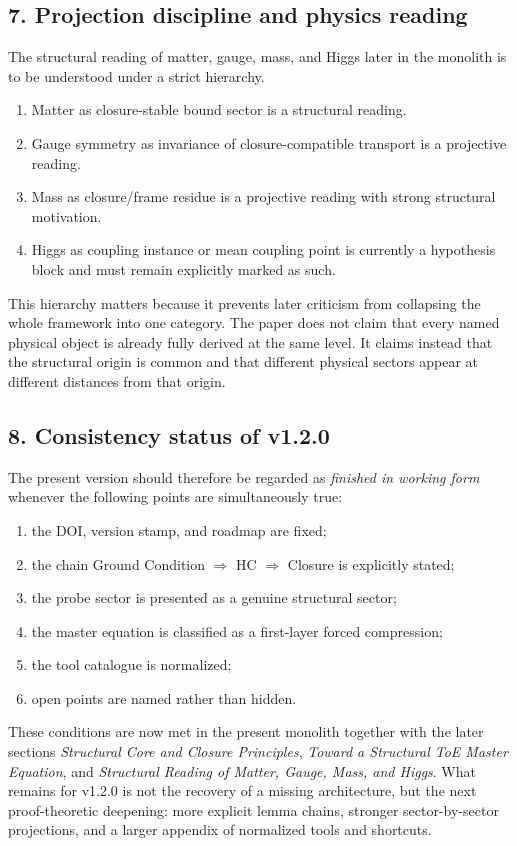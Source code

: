 \subsection*{7. Projection discipline and physics reading}
The structural reading of matter, gauge, mass, and Higgs later in the monolith
is to be understood under a strict hierarchy.
\begin{enumerate}[leftmargin=2em]
  \item Matter as closure-stable bound sector is a structural reading.
  \item Gauge symmetry as invariance of closure-compatible transport is a
  projective reading.
  \item Mass as closure/frame residue is a projective reading with strong
  structural motivation.
  \item Higgs as coupling instance or mean coupling point is currently a
  hypothesis block and must remain explicitly marked as such.
\end{enumerate}

This hierarchy matters because it prevents later criticism from collapsing the
whole framework into one category. The paper does not claim that every named
physical object is already fully derived at the same level. It claims instead
that the structural origin is common and that different physical sectors appear
at different distances from that origin.

\subsection*{8. Consistency status of v1.2.0}
The present version should therefore be regarded as \emph{finished in working
form} whenever the following points are simultaneously true:
\begin{enumerate}[leftmargin=2em]
  \item the DOI, version stamp, and roadmap are fixed;
  \item the chain Ground Condition $\Rightarrow$ HC $\Rightarrow$ Closure is
  explicitly stated;
  \item the probe sector is presented as a genuine structural sector;
  \item the master equation is classified as a first-layer forced compression;
  \item the tool catalogue is normalized;
  \item open points are named rather than hidden.
\end{enumerate}

These conditions are now met in the present monolith together with the later
sections \emph{Structural Core and Closure Principles}, \emph{Toward a
Structural ToE Master Equation}, and \emph{Structural Reading of Matter,
Gauge, Mass, and Higgs}. What remains for v1.2.0 is not the recovery of a
missing architecture, but the next proof-theoretic deepening: more explicit
lemma chains, stronger sector-by-sector projections, and a larger appendix of
normalized tools and shortcuts.

